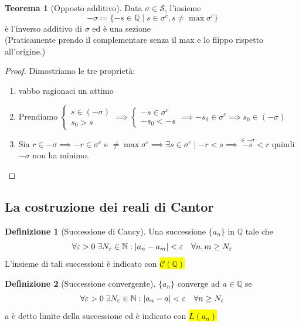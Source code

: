 \documentclass[a4paper,10pt]{article}
\theoremstyle{definition}
\newcommand{\na}{\mathbb{N}} %
\newcommand{\qu}{\mathbb{Q}} %
\theoremstyle{indentdefinition}
\newtheorem{defn}{Definizione}[section]
\theoremstyle{indentpostulate}
\theoremstyle{indenttheorem}
\newtheorem{thm}{Teorema}[section]
\theoremstyle{myremark}
\theoremstyle{indentgeneral}
\newenvironment{myboxed} 
{\noindent\begin{lrbox}{\mybox}\begin{minipage}{\textwidth}}
{\end{minipage}\end{lrbox}\fbox{\usebox{\mybox}}}
\begin{document}
\begin{myboxed}
    \begin{thm}[Opposto additivo]
        Data $\sigma\in\mathscr{S}$, l'insieme
        $$-\sigma\coloneqq\{-s\in\qu\mid s\in\sigma^c,s\ne\max\sigma^c\}$$
        è l'inverso additivo di $\sigma$ ed è una sezione \\
        (Praticamente prendo il complementare senza il max e lo flippo rispetto all'origine.)
    \end{thm}
\end{myboxed}
\begin{proof}Dimostriamo le tre proprietà:
\begin{enumerate}
    \item vabbo ragionaci un attimo
    \item Prendiamo $\begin{cases}
        s\in(-\sigma)\\
        s_0>s
    \end{cases}\implies\begin{cases}
        -s\in\sigma^c\\
        -s_0<-s
    \end{cases}\implies-s_0\in\sigma^c\implies s_0\in(-\sigma)$
    \item Sia $r\in-\sigma\implies-r\in\sigma^c$ e $\ne\max\sigma^c\implies \exists s\in\sigma^c\mid -r<s\implies\overset{\in-\sigma}{-s}<r$ quindi $-\sigma$ non ha minimo.
\end{enumerate}
    
\end{proof}

\subsection{La costruzione dei reali di Cantor}
\begin{defn}[Successione di Caucy]
    Una successione $\{a_n\}$ in $\qu$ tale che $$\forall\varepsilon>0\;\exists N_\varepsilon\in\na: \abs{a_n-a_m}<\varepsilon\quad\forall n,m\ge N_\varepsilon$$
    L'insieme di tali successioni è indicato con \hl{$\mathscr{C}(\qu)$}
\end{defn}

\begin{defn}[Successione convergente]
    $\{a_n\}$ converge ad $a\in\qu$ se 
    $$\forall\varepsilon>0\;\exists N_\varepsilon\in\na: \abs{a_n-a}<\varepsilon\quad\forall n\ge N_\varepsilon$$
    $a$ è detto limite della successione ed è indicato con \hl{$L(a_n)$}
\end{defn}
\end{document}
